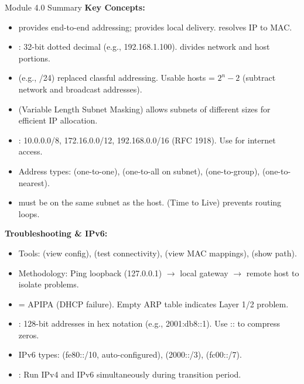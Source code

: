 \documentclass[aspectratio=169]{beamer}  %
\begin{document}
\begin{frame}[t,allowframebreaks]{Module 4.0 Summary}
    \small
    \textbf{Key Concepts:}
    \begin{itemize}
        \item {} provides end-to-end addressing;  provides local delivery.  resolves IP to MAC.
        \item {}: 32-bit dotted decimal (e.g., 192.168.1.100).  divides network and host portions.
        \item {} (e.g., /24) replaced classful addressing. Usable hosts = $2^n - 2$ (subtract network and broadcast addresses).
        \item {} (Variable Length Subnet Masking) allows subnets of different sizes for efficient IP allocation.
        \item {}: 10.0.0.0/8, 172.16.0.0/12, 192.168.0.0/16 (RFC 1918). Use  for internet access.
        \item Address types:  (one-to-one),  (one-to-all on subnet),  (one-to-group),  (one-to-nearest).
        \item {} must be on the same subnet as the host.  (Time to Live) prevents routing loops.
    \end{itemize}
    \framebreak
    
    \vspace{0.3em}
    \textbf{Troubleshooting \& IPv6:}
    \begin{itemize}
        \item Tools:  (view config),  (test connectivity),  (view MAC mappings),  (show path).
        \item Methodology: Ping loopback (127.0.0.1) $\rightarrow$ local gateway $\rightarrow$ remote host to isolate problems.
        \item {} = APIPA (DHCP failure). Empty ARP table indicates Layer 1/2 problem.
        \item {}: 128-bit addresses in hex notation (e.g., 2001:db8::1). Use :: to compress zeros.
        \item IPv6 types:  (fe80::/10, auto-configured),  (2000::/3),  (fc00::/7).
        \item {}: Run IPv4 and IPv6 simultaneously during transition period.
    \end{itemize}
\end{frame}
\end{document}
